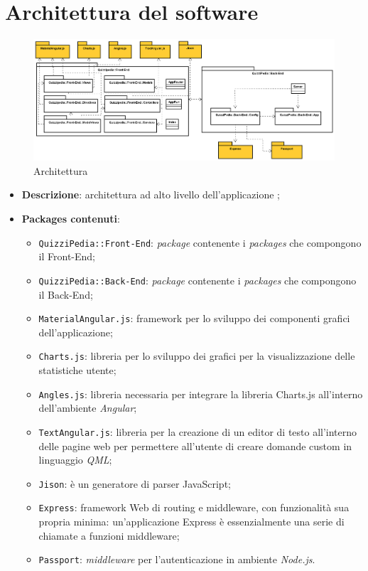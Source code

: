 \newpage

\section{Architettura del software}
\label{Architettura}
\begin{figure}[ht]
	\centering
	\includegraphics[scale=0.35]{UML/Package/QuizziPedia.png}
	\caption{Architettura}
\end{figure}
\FloatBarrier
\begin{itemize}
	\item \textbf{Descrizione}: architettura ad alto livello dell'applicazione \progetto;
	\item \textbf{Packages contenuti}:
	\begin{itemize}
		\item \texttt{QuizziPedia::Front-End}: \textit{package} contenente i \textit{packages} che compongono il Front-End;
		\item \texttt{QuizziPedia::Back-End}: \textit{package} contenente i \textit{packages} che compongono il Back-End;
		\item \texttt{MaterialAngular.js}: framework per lo sviluppo dei componenti grafici dell'applicazione;
		\item \texttt{Charts.js}: libreria per lo sviluppo dei grafici per la visualizzazione delle statistiche utente;
		\item \texttt{Angles.js}: libreria necessaria per integrare la libreria Charts.js all'interno dell'ambiente \textit{Angular};
		\item \texttt{TextAngular.js}: libreria per la creazione di un editor di testo all'interno delle pagine web per permettere all'utente di creare domande custom in linguaggio \textit{QML};
		\item \texttt{Jison}: è un generatore di parser JavaScript;
		\item \texttt{Express}: framework Web di routing e middleware, con funzionalità sua propria minima: un’applicazione Express è essenzialmente una serie di chiamate a funzioni middleware;
		\item \texttt{Passport}: \textit{middleware} per l'autenticazione in ambiente \textit{Node.js}.
	\end{itemize}
\end{itemize}
